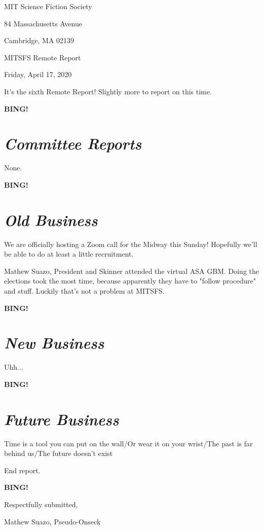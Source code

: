 \documentclass[10pt]{article}
\newcommand{\bing}{{\bf BING!} }
\newcommand{\goto}[1]{\bing \vskip 12pt \section*{{\em{#1}}}}
\newcommand{\skinner}{Mathew Suazo, President and Skinner\xspace}
\newcommand{\onseck}{Mathew Suazo, Pseudo-Onseck\xspace}
\newcommand{\meetingdate}{Friday, April 17, 2020}
\begin{document}
\begin{center}

MIT Science Fiction Society

84 Massachusetts Avenue

Cambridge, MA 02139

\vspace{12pt}

MITSFS Remote Report

\meetingdate

\end{center}

\vspace{18pt}

\setlength{\parskip}{6pt}

\noindent
It's the sixth Remote Report! Slightly more to report on this time.

\goto{Committee Reports}

None.

\goto{Old Business}

We are officially hosting a Zoom call for the Midway this Sunday! Hopefully we'll be able to do at least a little recruitment.

\skinner attended the virtual ASA GBM. Doing the elections took the most time, because apparently they have to "follow procedure" and stuff. Luckily that's not a problem at MITSFS.

\goto{New Business}

Uhh...

\goto{Future Business}

Time is a tool you can put on the wall/Or wear it on your wrist/The past is far behind us/The future doesn't exist

\noindent
End report.

\bing
\vspace{18pt}

\centerline{Respectfully submitted,}
\centerline{\onseck}
\end{document}
